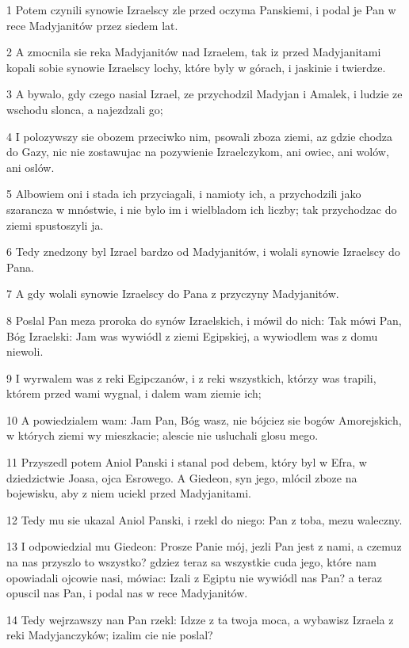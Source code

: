 \par 1 Potem czynili synowie Izraelscy zle przed oczyma Panskiemi, i podal je Pan w rece Madyjanitów przez siedem lat.
\par 2 A zmocnila sie reka Madyjanitów nad Izraelem, tak iz przed Madyjanitami kopali sobie synowie Izraelscy lochy, które byly w górach, i jaskinie i twierdze.
\par 3 A bywalo, gdy czego nasial Izrael, ze przychodzil Madyjan i Amalek, i ludzie ze wschodu slonca, a najezdzali go;
\par 4 I polozywszy sie obozem przeciwko nim, psowali zboza ziemi, az gdzie chodza do Gazy, nic nie zostawujac na pozywienie Izraelczykom, ani owiec, ani wolów, ani oslów.
\par 5 Albowiem oni i stada ich przyciagali, i namioty ich, a przychodzili jako szarancza w mnóstwie, i nie bylo im i wielbladom ich liczby; tak przychodzac do ziemi spustoszyli ja.
\par 6 Tedy znedzony byl Izrael bardzo od Madyjanitów, i wolali synowie Izraelscy do Pana.
\par 7 A gdy wolali synowie Izraelscy do Pana z przyczyny Madyjanitów.
\par 8 Poslal Pan meza proroka do synów Izraelskich, i mówil do nich: Tak mówi Pan, Bóg Izraelski: Jam was wywiódl z ziemi Egipskiej, a wywiodlem was z domu niewoli.
\par 9 I wyrwalem was z reki Egipczanów, i z reki wszystkich, którzy was trapili, którem przed wami wygnal, i dalem wam ziemie ich;
\par 10 A powiedzialem wam: Jam Pan, Bóg wasz, nie bójciez sie bogów Amorejskich, w których ziemi wy mieszkacie; alescie nie usluchali glosu mego.
\par 11 Przyszedl potem Aniol Panski i stanal pod debem, który byl w Efra, w dziedzictwie Joasa, ojca Esrowego. A Giedeon, syn jego, mlócil zboze na bojewisku, aby z niem uciekl przed Madyjanitami.
\par 12 Tedy mu sie ukazal Aniol Panski, i rzekl do niego: Pan z toba, mezu waleczny.
\par 13 I odpowiedzial mu Giedeon: Prosze Panie mój, jezli Pan jest z nami, a czemuz na nas przyszlo to wszystko? gdziez teraz sa wszystkie cuda jego, które nam opowiadali ojcowie nasi, mówiac: Izali z Egiptu nie wywiódl nas Pan? a teraz opuscil nas Pan, i podal nas w rece Madyjanitów.
\par 14 Tedy wejrzawszy nan Pan rzekl: Idzze z ta twoja moca, a wybawisz Izraela z reki Madyjanczyków; izalim cie nie poslal?
